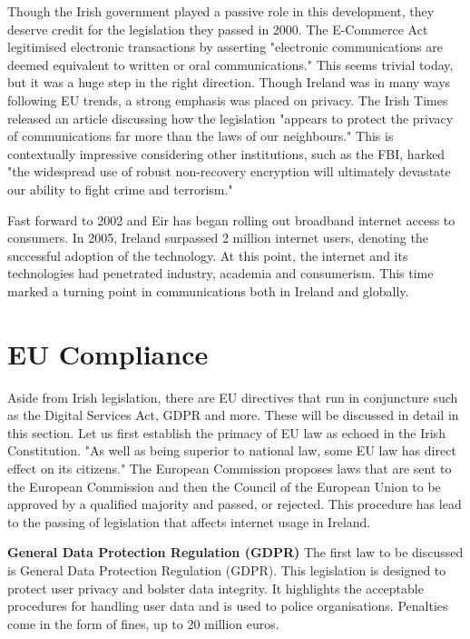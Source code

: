 Though the Irish government played a passive role in this development, they deserve credit for the legislation they passed in 2000. The E-Commerce Act legitimised electronic transactions by asserting "electronic communications are deemed equivalent to written or oral communications." \cite{electronic_documents_legalguide} This seems trivial today, but it was a huge step in the right direction. Though Ireland was in many ways following EU trends, a strong emphasis was placed on privacy. The Irish Times released an article discussing how the legislation "appears to protect the privacy of communications far more than the laws of our neighbours." \cite{irishtimes_privacy_legislation} This is contextually impressive considering other institutions, such as the FBI, harked "the widespread use of robust non-recovery encryption will ultimately devastate our ability to fight crime and terrorism." \cite{irishtimes_privacy_legislation} 

Fast forward to 2002 and Eir has began rolling out broadband internet access to consumers. In 2005, Ireland surpassed 2 million internet users, denoting the successful adoption of the technology. At this point, the internet and its technologies had penetrated industry, academia and consumerism. This time marked a turning point in communications both in Ireland and globally.

\section{EU Compliance}
Aside from Irish legislation, there are EU directives that run in conjuncture such as the Digital Services Act, GDPR and more. These will be discussed in detail in this section. Let us first establish the primacy of EU law as echoed in the Irish Constitution. "As well as being superior to national law, some EU law has direct effect on its citizens." \cite{citizensinformation2025} The European Commission proposes laws that are sent to the European Commission and then the Council of the European Union to be approved by a qualified majority and passed, or rejected. \cite{europa2025} This procedure has lead to the passing of legislation that affects internet usage in Ireland. 

\textbf{General Data Protection Regulation (GDPR)}
The first law to be discussed is General Data Protection Regulation (GDPR). This legislation is designed to protect user privacy and bolster data integrity. It highlights the acceptable procedures for handling user data and is used to police organisations. Penalties come in the form of fines, up to 20 million euros. \cite{gdprinfo2025} 

